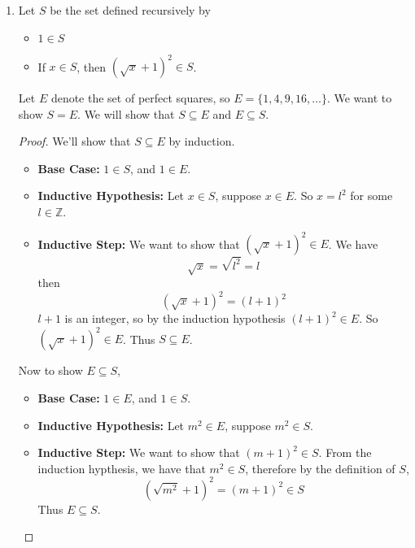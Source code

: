 \documentclass[openany]{report}
\begin{document}
\begin{enumerate}[label=(\alph*)]
\begin{proof}
\begin{itemize}
        \end{itemize}
        Now to show $E \subseteq S$,
        \begin{itemize}
            \item \textbf{Base Case:} $1 \in E$, and $1 \in S$.
            \item \textbf{Inductive Hypothesis:} Let $m \in E$, suppose $m \in S$. $m = 3^l$ for some $l \in \mathbb{Z}$.
            \item \textbf{Inductive Step:} From the induction hypothesis, we have that $3^l \in S$, we want to show that $3^{l+1} \in S$. So we have 
            \[3^{l+1} = 3 \cdot 3^l\]
            By the induction hypothesis, $3^l \in S$, so $3^{l+1} \in S$.
        \end{itemize}
    \end{proof}
    \item Let $S$ be the set defined recursively by
    \begin{itemize}
        \item $1 \in S$
        \item If $x \in S$, then $\left(\sqrt{x} + 1\right)^2 \in S$.
    \end{itemize}
    Let $E$ denote the set of perfect squares, so $E = \{1,4,9,16,\ldots\}$. We want to show $S = E$. We will show that $S \subseteq E$ and $E \subseteq S$.
    \begin{proof}
        We'll show that $S \subseteq E$ by induction.
        \begin{itemize}
            \item \textbf{Base Case:} $1 \in S$, and $1 \in E$.
            \item \textbf{Inductive Hypothesis:} Let $x \in S$, suppose $x \in E$. So $x = l^2$ for some $l \in \mathbb{Z}$.
            \item \textbf{Inductive Step:} We want to show that $(\sqrt{x} + 1)^2 \in E$. We have
            \[\sqrt{x} = \sqrt{l^2} = l \]
            then 
            \[\left(\sqrt{x} + 1\right)^2 = \left(l +1\right)^2 \]
            $l +1$ is an integer, so by the induction hypothesis $(l+1)^2 \in E$. So $(\sqrt{x} + 1)^2 \in E$. Thus $S \subseteq E$.
        \end{itemize}
        Now to show $E \subseteq S$,
        \begin{itemize}
            \item \textbf{Base Case:} $1 \in E$, and $1 \in S$.
            \item \textbf{Inductive Hypothesis: } Let $m^2 \in E$, suppose $m^2 \in S$.
            \item \textbf{Inductive Step:} We want to show that $(m+1)^2 \in S$. From the induction hypthesis, we have that $m^2 \in S$, therefore by the definition of $S$, 
            \[(\sqrt{m^2}+1)^2 = (m+1)^2 \in S\] 
            Thus $E \subseteq S$. 
        \end{itemize}
    \end{proof}
\end{enumerate}
\end{document}
